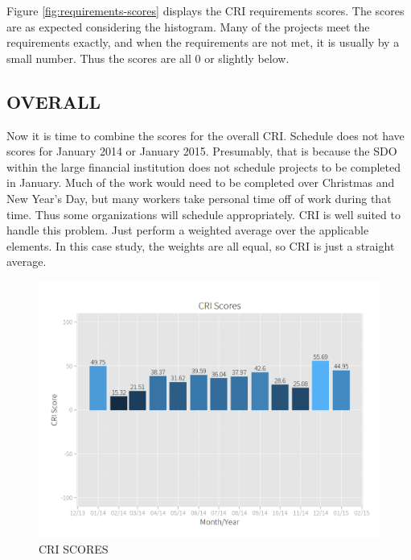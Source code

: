 \documentclass[SDSUThesis.tex]{subfiles}
\begin{document}
        Figure \ref{fig:requirements-scores} displays the CRI requirements
        scores. The scores are as expected considering the histogram. Many
        of the projects meet the requirements exactly, and when the requirements
        are not met, it is usually by a small number.
        Thus the scores are all 0 or slightly below.
        
    \subsection{OVERALL}
        Now it is time to combine the scores for the overall CRI.
        Schedule does not have scores for January 2014 or January 2015.
        Presumably, that is because the SDO within the large financial institution
        does not schedule projects to be completed in January. Much of the work
        would need to be completed over Christmas and New Year's Day, but many
        workers take personal time off of work during that time.  Thus some
        organizations will schedule appropriately.  CRI is well suited to
        handle this problem.  Just perform a weighted average over the
        applicable elements.  In this case study, the weights are all equal,
        so CRI is just a straight average.  
        
        \begin{figure}[htb]
            \centering
            \includegraphics[scale=.3]{images/cri_scores.png}
            \caption{CRI SCORES}
            \label{fig:cri-scores}
        \end{figure}
        
\end{document}
